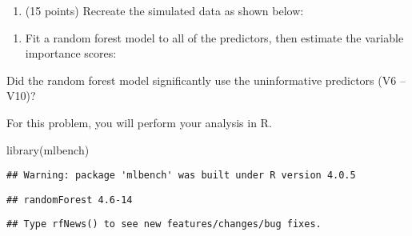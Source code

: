 \documentclass[
]{article}
\newenvironment{Shaded}{\begin{snugshade}}{\end{snugshade}}
\newcommand{\AttributeTok}[1]{\textcolor[rgb]{0.77,0.63,0.00}{#1}}
\newcommand{\DecValTok}[1]{\textcolor[rgb]{0.00,0.00,0.81}{#1}}
\newcommand{\FunctionTok}[1]{\textcolor[rgb]{0.00,0.00,0.00}{#1}}
\newcommand{\NormalTok}[1]{#1}
\newcommand{\OtherTok}[1]{\textcolor[rgb]{0.56,0.35,0.01}{#1}}
\newcommand{\SpecialCharTok}[1]{\textcolor[rgb]{0.00,0.00,0.00}{#1}}
\newcommand{\StringTok}[1]{\textcolor[rgb]{0.31,0.60,0.02}{#1}}
\providecommand{\tightlist}{%
  \setlength{\itemsep}{0pt}\setlength{\parskip}{0pt}}
\begin{document}
\begin{enumerate}
\def\labelenumi{\arabic{enumi}.}
\setcounter{enumi}{3}
\tightlist
\item
  (15 points) Recreate the simulated data as shown below:
\end{enumerate}

\begin{enumerate}
\def\labelenumi{(\alph{enumi})}
\tightlist
\item
  Fit a random forest model to all of the predictors, then estimate the
  variable importance scores:
\end{enumerate}

Did the random forest model significantly use the uninformative
predictors (V6 -- V10)?

For this problem, you will perform your analysis in R.

\begin{Shaded}
\begin{Highlighting}[]
\FunctionTok{library}\NormalTok{(mlbench)}
\end{Highlighting}
\end{Shaded}

\begin{verbatim}
## Warning: package 'mlbench' was built under R version 4.0.5
\end{verbatim}

\begin{Shaded}
\end{Shaded}

\begin{verbatim}
## randomForest 4.6-14
\end{verbatim}

\begin{verbatim}
## Type rfNews() to see new features/changes/bug fixes.
\end{verbatim}
\end{document}
